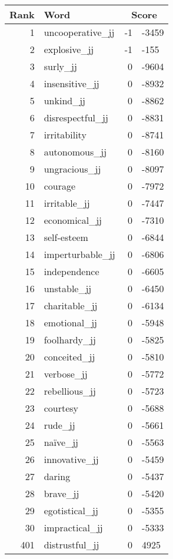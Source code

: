\begin{longtable}[!htbp]{| rlr@{.}l |}
    \hline
    \textbf{Rank} & \textbf{Word} & \multicolumn{2}{c|}{\textbf{Score}} \\
    \hline
    \endhead
    1 & uncooperative\_jj & -1 & -3459 \\
    2 & explosive\_jj & -1 & -155 \\
    3 & surly\_jj & 0 & -9604 \\
    4 & insensitive\_jj & 0 & -8932 \\
    5 & unkind\_jj & 0 & -8862 \\
    6 & disrespectful\_jj & 0 & -8831 \\
    7 & irritability & 0 & -8741 \\
    8 & autonomous\_jj & 0 & -8160 \\
    9 & ungracious\_jj & 0 & -8097 \\
    10 & courage & 0 & -7972 \\
    11 & irritable\_jj & 0 & -7447 \\
    12 & economical\_jj & 0 & -7310 \\
    13 & self-esteem & 0 & -6844 \\
    14 & imperturbable\_jj & 0 & -6806 \\
    15 & independence & 0 & -6605 \\
    16 & unstable\_jj & 0 & -6450 \\
    17 & charitable\_jj & 0 & -6134 \\
    18 & emotional\_jj & 0 & -5948 \\
    19 & foolhardy\_jj & 0 & -5825 \\
    20 & conceited\_jj & 0 & -5810 \\
    21 & verbose\_jj & 0 & -5772 \\
    22 & rebellious\_jj & 0 & -5723 \\
    23 & courtesy & 0 & -5688 \\
    24 & rude\_jj & 0 & -5661 \\
    25 & naïve\_jj & 0 & -5563 \\
    26 & innovative\_jj & 0 & -5459 \\
    27 & daring & 0 & -5437 \\
    28 & brave\_jj & 0 & -5420 \\
    29 & egotistical\_jj & 0 & -5355 \\
    30 & impractical\_jj & 0 & -5333 \\
    401 & distrustful\_jj & 0 & 4925 \\

\end{longtable}
